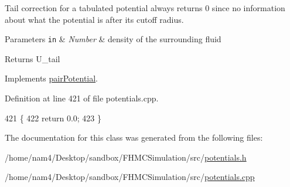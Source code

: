 Tail correction for a tabulated potential always returns 0 since no information about what the potential is after its cutoff radius. 


\begin{DoxyParams}[1]{Parameters}
\mbox{\tt in}  & {\em Number} & density of the surrounding fluid\\
\hline
\end{DoxyParams}
\begin{DoxyReturn}{Returns}
U\-\_\-tail 
\end{DoxyReturn}


Implements \hyperlink{classpair_potential_a5387d21d8d487d1d42e9eaf7cae9175b}{pair\-Potential}.



Definition at line 421 of file potentials.\-cpp.


\begin{DoxyCode}
421                                                      \{
422     \textcolor{keywordflow}{return} 0.0;
423 \}
\end{DoxyCode}


The documentation for this class was generated from the following files\-:\begin{DoxyCompactItemize}
\item 
/home/nam4/\-Desktop/sandbox/\-F\-H\-M\-C\-Simulation/src/\hyperlink{potentials_8h}{potentials.\-h}\item 
/home/nam4/\-Desktop/sandbox/\-F\-H\-M\-C\-Simulation/src/\hyperlink{potentials_8cpp}{potentials.\-cpp}\end{DoxyCompactItemize}
